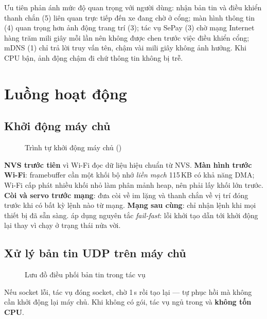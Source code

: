 \begin{lydo}
Ưu tiên phản ánh mức độ quan trọng với người dùng: nhận bản tin và điều khiển thanh
chắn (5) liên quan trực tiếp đến xe đang chờ ở cổng; màn hình thông tin (4) quan
trọng hơn ảnh động trang trí (3); tác vụ SePay (3) chờ mạng Internet hàng trăm mili
giây mỗi lần nên không được chen trước việc điều khiển cổng; mDNS (1) chỉ trả lời truy vấn tên, chậm vài mili
giây không ảnh hưởng. Khi CPU bận, ảnh động chậm đi chứ thông tin không bị trễ.
\end{lydo}

\section{Luồng hoạt động}\label{sec:luong}
\subsection{Khởi động máy chủ}
\begin{figure}[H]
\centering
{}
\caption{Trình tự khởi động máy chủ ()}\label{fig:boot}
\end{figure}

\begin{lydo}
\textbf{NVS trước tiên} vì Wi-Fi đọc dữ liệu hiệu chuẩn từ NVS. \textbf{Màn hình
trước Wi-Fi}: framebuffer cần một khối bộ nhớ \emph{liền mạch} 115\,KB có khả năng
DMA; Wi-Fi cấp phát nhiều khối nhỏ làm phân mảnh heap, nên phải lấy khối lớn trước.
\textbf{Còi và servo trước mạng}: đưa còi về im lặng và thanh chắn về vị trí đóng
trước khi có bất kỳ lệnh nào từ mạng. \textbf{Mạng sau cùng}: chỉ nhận lệnh khi mọi
thiết bị đã sẵn sàng.  áp dụng nguyên tắc \emph{fail-fast}:
lỗi khởi tạo dẫn tới khởi động lại thay vì chạy ở trạng thái nửa vời.
\end{lydo}

\subsection{Xử lý bản tin UDP trên máy chủ}
\begin{figure}[H]
\centering
{}
\caption{Lưu đồ điều phối bản tin trong tác vụ }\label{fig:udpflow}
\end{figure}
Nếu socket lỗi, tác vụ đóng socket, chờ 1\,s rồi tạo lại — tự phục hồi mà không cần
khởi động lại máy chủ. Khi không có gói, tác vụ ngủ trong  và
\textbf{không tốn CPU}.

